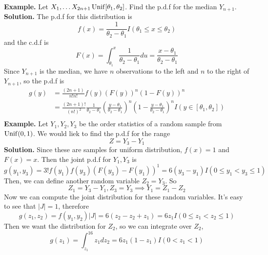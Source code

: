 \documentclass[openany]{report}
\begin{document}
    \textbf{Example.} Let $X_1, \ldots X_{2n+1} \operatorname{Unif}[\theta_1, \theta_2]$. Find the p.d.f for the median $Y_{n+1}$. \\[2ex]
    \textbf{Solution.} The p.d.f for this distribution is 
    \[f(x) = \frac{1}{\theta_2-\theta_1}I(\theta_1 \leq x \leq \theta_2)\]
    and the c.d.f is 
    \[F(x) = \int_{\theta_1}^x \frac{1}{\theta_2 - \theta_1} du = \frac{x - \theta_1}{\theta_2-\theta_1}\]
    Since $Y_{n+1}$ is the median, we have $n$ observations to the left and $n$ to the right of $Y_{n+1}$, so the p.d.f is 
    \begin{align*}
        g(y) &= \frac{(2n+1)}{n!n!}f(y)(F(y))^n(1-F(y))^n\\
        &=\frac{(2n+1)!}{(n!)^2}\frac{1}{\theta_2-\theta_1}\left(\frac{y-\theta_1}{\theta_2-\theta_1}\right)^n\left(1 - \frac{y - \theta_1}{\theta_2-\theta_1}\right)^nI(y \in [\theta_1, \theta_2])\\
    \end{align*}    
    \textbf{Example.} Let $Y_1, Y_2, Y_3$ be the order statistics of a random sample from $\operatorname{Unif}(0,1)$. We would liek to find the p.d.f for the range 
    \[Z = Y_3 - Y_1\]
    \textbf{Solution.} Since these are samples for uniform distribution, $f(x) = 1$ and $F(x) = x$. Then the joint p.d.f for $Y_1,Y_3$ is 
    \[g(y_1,y_3) = 3!f(y_1)f(y_3)(F(y_3)-F(y_1))^1 = 6(y_3 - y_1)I(0 \leq y_1 < y_3 \leq 1)\]
    Then, we can define another random variable $Z_2 = Y_3$. So
    \[Z_1 = Y_3 - Y_1, Z_3 = Y_3 \implies Y_1 = Z_1 - Z_2\]
    Now we can compute the joint distribution for these random variables. It's easy to see that $|J| = 1$, therefore 
    \[g(z_1,z_2) = f(y_1,y_2)|J| = 6(z_2 - z_2 + z_1 ) = 6z_1I(0 \leq z_1 < z_2 \leq 1)\]
    Then we want the distribution for $Z_2$, so we can integrate over $Z_2$, 
    \[g(z_1) = \int_{z_1}^16z_1dz_2 = 6z_1(1-z_1)I(0 < z_1 < 1)\]
\end{document}
